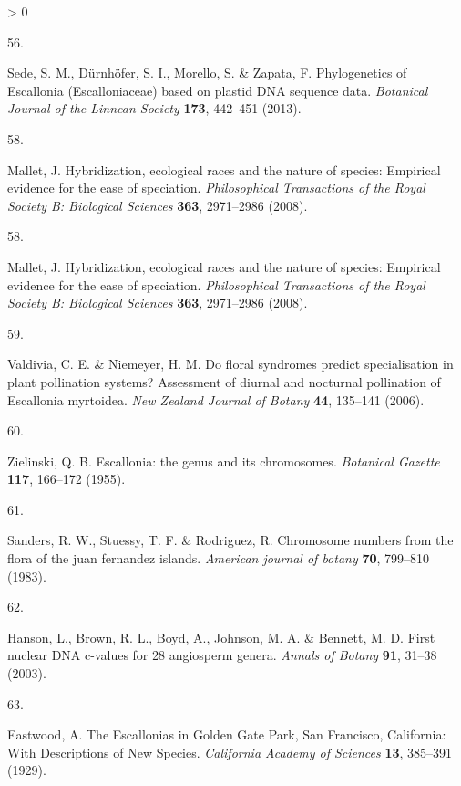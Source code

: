 \documentclass[
  11pt,
]{article}
\newlength{\cslhangindent}
\newlength{\csllabelwidth}
\newenvironment{CSLReferences}[2] %
 {%
  \setlength{\parindent}{0pt}
  \ifodd #1 \everypar{\setlength{\hangindent}{\cslhangindent}}\ignorespaces\fi
  \ifnum #2 > 0
  \setlength{\parskip}{#2\baselineskip}
  \fi
 }%
 {}
\newcommand{\CSLLeftMargin}[1]{\parbox[t]{\csllabelwidth}{#1}}
\newcommand{\CSLRightInline}[1]{\parbox[t]{\linewidth - \csllabelwidth}{#1}\break}
\begin{document}
\begin{CSLReferences}{0}{0}
\leavevmode\hypertarget{ref-sede2013phylogenetics}{}%
\CSLLeftMargin{56. }
\CSLRightInline{Sede, S. M., Dürnhöfer, S. I., Morello, S. \& Zapata, F. {Phylogenetics of Escallonia (Escalloniaceae) based on plastid DNA sequence data}. \emph{Botanical Journal of the Linnean Society} \textbf{173}, 442--451 (2013).}

\leavevmode\hypertarget{ref-mallet2008hybridization}{}%
\CSLLeftMargin{58. }
\CSLRightInline{Mallet, J. Hybridization, ecological races and the nature of species: Empirical evidence for the ease of speciation. \emph{Philosophical Transactions of the Royal Society B: Biological Sciences} \textbf{363}, 2971--2986 (2008).}

\leavevmode\hypertarget{ref-mallet2008hybridization}{}%
\CSLLeftMargin{58. }
\CSLRightInline{Mallet, J. Hybridization, ecological races and the nature of species: Empirical evidence for the ease of speciation. \emph{Philosophical Transactions of the Royal Society B: Biological Sciences} \textbf{363}, 2971--2986 (2008).}

\leavevmode\hypertarget{ref-valdivia2006floral}{}%
\CSLLeftMargin{59. }
\CSLRightInline{Valdivia, C. E. \& Niemeyer, H. M. {Do floral syndromes predict specialisation in plant pollination systems? Assessment of diurnal and nocturnal pollination of Escallonia myrtoidea}. \emph{New Zealand Journal of Botany} \textbf{44}, 135--141 (2006).}

\leavevmode\hypertarget{ref-zielinski1955escallonia}{}%
\CSLLeftMargin{60. }
\CSLRightInline{Zielinski, Q. B. {Escallonia: the genus and its chromosomes}. \emph{Botanical Gazette} \textbf{117}, 166--172 (1955).}

\leavevmode\hypertarget{ref-sanders1983chromosome}{}%
\CSLLeftMargin{61. }
\CSLRightInline{Sanders, R. W., Stuessy, T. F. \& Rodriguez, R. Chromosome numbers from the flora of the juan fernandez islands. \emph{American journal of botany} \textbf{70}, 799--810 (1983).}

\leavevmode\hypertarget{ref-hanson2003first}{}%
\CSLLeftMargin{62. }
\CSLRightInline{Hanson, L., Brown, R. L., Boyd, A., Johnson, M. A. \& Bennett, M. D. First nuclear DNA c-values for 28 angiosperm genera. \emph{Annals of Botany} \textbf{91}, 31--38 (2003).}

\leavevmode\hypertarget{ref-eastwood1929escallonias}{}%
\CSLLeftMargin{63. }
\CSLRightInline{Eastwood, A. {The Escallonias in Golden Gate Park, San Francisco, California: With Descriptions of New Species}. \emph{California Academy of Sciences} \textbf{13}, 385--391 (1929).}


\end{CSLReferences}
\end{document}
